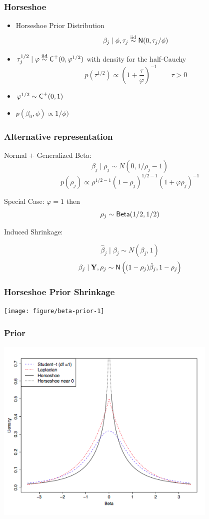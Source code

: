 \documentclass{beamer}\usepackage[]{graphicx}\usepackage[]{color}
\newenvironment{knitrout}{}{} %
\begin{document}
\begin{frame} \frametitle{Horseshoe}
\begin{itemize}
\item Horseshoe Prior Distribution
$$\beta_j \mid \phi, \tau_j \mathrel{\mathop{\sim}\limits^{\rm iid}} \textsf{N}(0, \tau_j/\phi) $$ \pause
\item $\tau_j^{1/2} \mid  \varphi \mathrel{\mathop{\sim}\limits^{\rm iid}} \textsf{C}^+(0, \varphi^{1/2})$ with density for the half-Cauchy
$$p(\tau^{1/2}) \propto \left(1 + \frac{\tau}{\varphi}\right)^{-1}  \qquad \tau > 0$$
\pause
\item $\varphi^{1/2} \sim \textsf{C}^+(0, 1)$ \pause
\item $p(\beta_0, \phi) \propto 1/\phi)$ \pause
\end{itemize}



\end{frame}


\begin{frame} \frametitle{Alternative representation}

Normal $+$ Generalized Beta:
$$\beta_j \mid \rho_j \sim N(0, 1/\rho_j - 1)$$
 \pause
$$ p(\rho_j) \propto \rho^{1/2 -1} (1 - \rho_j)^{1/2 - 1} (1 + \varphi \rho_j)^{-1}
$$
 \pause

Special Case:  $\varphi = 1$ then $$\rho_j \sim \textsf{Beta}(1/2, 1/2)$$
 \pause

\vspace{12pt}
Induced Shrinkage:

$$\hat{\beta}_j \mid \beta_j \sim N(\beta_j, 1)$$
$$\beta_j \mid \mathbf{Y}, \rho_j \sim \textsf{N}\left((1 - \rho_j) \hat{\beta}_j, 1 - \rho_j\right)$$
\end{frame}

\begin{frame}
\frametitle{Horseshoe Prior Shrinkage}
\begin{knitrout}
\color{fgcolor}

{\centering \texttt{[image: figure/beta-prior-1]} 

}



\end{knitrout}

\end{frame}

\begin{frame}\frametitle{Prior}
\includegraphics[height=3.5in]{prior}
\end{frame}
\end{document}
